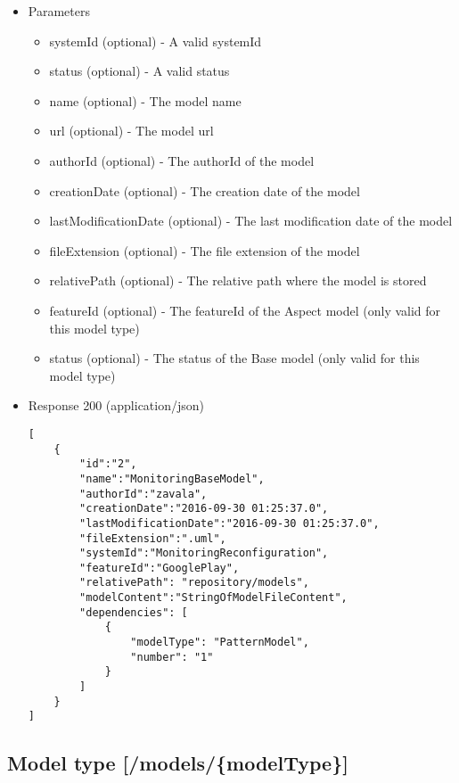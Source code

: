 \begin{itemize}
\item
  Parameters

  \begin{itemize}
  \item
    systemId (optional) - A valid systemId
  \item
    status (optional) - A valid status
  \item
    name (optional) - The model name
  \item
    url (optional) - The model url
  \item
    authorId (optional) - The authorId of the model
  \item
    creationDate (optional) - The creation date of the model
  \item
    lastModificationDate (optional) - The last modification date of the
    model
  \item
    fileExtension (optional) - The file extension of the model
  \item
    relativePath (optional) - The relative path where the model is
    stored
  \item
    featureId (optional) - The featureId of the Aspect model (only valid
    for this model type)
  \item
    status (optional) - The status of the Base model (only valid for
    this model type)
  \end{itemize}
\item
  Response 200 (application/json)

\begin{verbatim}
[
    {
        "id":"2",
        "name":"MonitoringBaseModel",
        "authorId":"zavala",
        "creationDate":"2016-09-30 01:25:37.0",
        "lastModificationDate":"2016-09-30 01:25:37.0",
        "fileExtension":".uml",
        "systemId":"MonitoringReconfiguration",
        "featureId":"GooglePlay",
        "relativePath": "repository/models",
        "modelContent":"StringOfModelFileContent",
        "dependencies": [
            {
                "modelType": "PatternModel",
                "number": "1"
            }
        ]
    }
]
\end{verbatim}
\end{itemize}

\subsection{Model type
{[}/models/\{modelType\}{]}}\label{model-type-modelsmodeltype}

